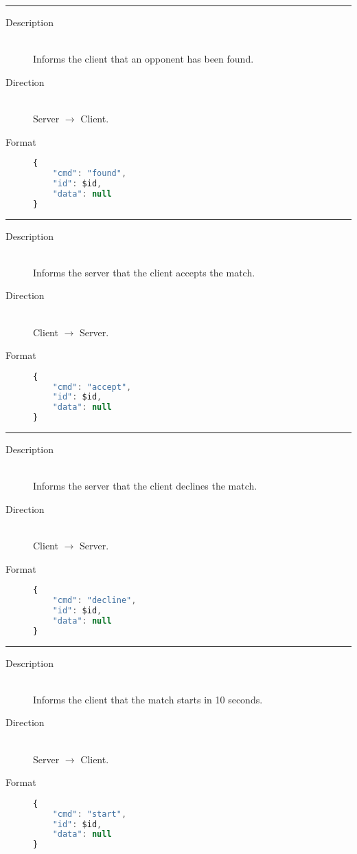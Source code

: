 \hrule

\begin{description}
\item[Description] \hfill \\
	Informs the client that an opponent has been found.
\item[Direction] \hfill \\
	Server $\rightarrow$ Client.
\item[Format] \hfill
\begin{lstlisting}[language=JavaScript]
{
	"cmd": "found",
	"id": $id,
	"data": null
}
\end{lstlisting}
\end{description}

\hrule

\begin{description}
\item[Description] \hfill \\
	Informs the server that the client accepts the match.
\item[Direction] \hfill \\
	Client $\rightarrow$ Server.
\item[Format] \hfill
\begin{lstlisting}[language=JavaScript]
{
	"cmd": "accept",
	"id": $id,
	"data": null
}
\end{lstlisting}
\end{description}

\hrule

\begin{description}
\item[Description] \hfill \\
	Informs the server that the client declines the match.
\item[Direction] \hfill \\
	Client $\rightarrow$ Server.
\item[Format] \hfill
\begin{lstlisting}[language=JavaScript]
{
	"cmd": "decline",
	"id": $id,
	"data": null
}
\end{lstlisting}
\end{description}

\hrule

\begin{description}
\item[Description] \hfill \\
	Informs the client that the match starts in 10 seconds.
\item[Direction] \hfill \\
	Server $\rightarrow$ Client.
\item[Format] \hfill
\begin{lstlisting}[language=JavaScript]
{
	"cmd": "start",
	"id": $id,
	"data": null
}
\end{lstlisting}
\end{description}
